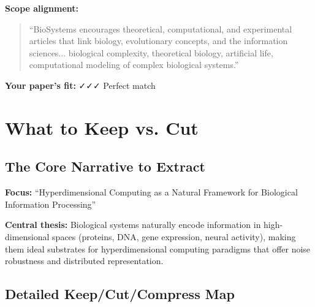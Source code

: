 \documentclass[11pt]{article}
\begin{document}
\textbf{Scope alignment:}
\begin{quote}
``BioSystems encourages theoretical, computational, and experimental articles that link biology, evolutionary concepts, and the information sciences... biological complexity, theoretical biology, artificial life, computational modeling of complex biological systems.''
\end{quote}

\textbf{Your paper's fit:} ✓✓✓ Perfect match

\section{What to Keep vs. Cut}

\subsection{The Core Narrative to Extract}

\textbf{Focus:} ``Hyperdimensional Computing as a Natural Framework for Biological Information Processing''

\textbf{Central thesis:} Biological systems naturally encode information in high-dimensional spaces (proteins, DNA, gene expression, neural activity), making them ideal substrates for hyperdimensional computing paradigms that offer noise robustness and distributed representation.

\subsection{Detailed Keep/Cut/Compress Map}
\end{document}
